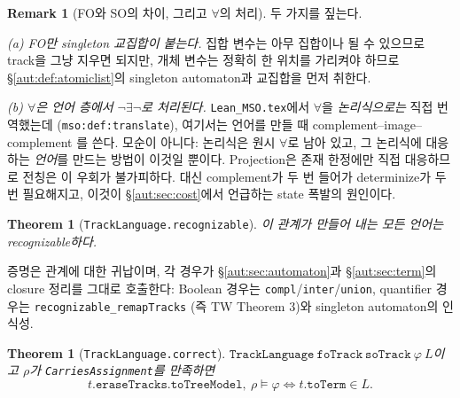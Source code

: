 \documentclass[11pt]{article}
\theoremstyle{definition}
\newtheorem{remark}[definition]{Remark}
\theoremstyle{plain}
\newtheorem{theorem}[definition]{Theorem}
\newcommand{\lean}[1]{\texttt{#1}}
\newcommand{\leanfile}[1]{\texttt{#1}}
\begin{document}
\begin{remark}[FO와 SO의 차이, 그리고 $\forall$의 처리]
\label{aut:rem:quantifiershapes}
두 가지를 짚는다.

\emph{(a) FO만 singleton 교집합이 붙는다.} 집합 변수는 아무 집합이나 될 수
있으므로 track을 그냥 지우면 되지만, 개체 변수는 정확히 한 위치를 가리켜야
하므로 \S\ref{aut:def:atomiclist}의 singleton automaton과 교집합을 먼저
취한다.

\emph{(b) $\forall$은 언어 층에서 $\lnot \exists \lnot$로 처리된다.}
\leanfile{Lean\_MSO.tex}에서 $\forall$을 \emph{논리식으로는} 직접 번역했는데
(\lean{mso:def:translate}), 여기서는 언어를 만들 때 complement--image--complement
를 쓴다. 모순이 아니다: 논리식은 원시 $\forall$로 남아 있고, 그 논리식에
대응하는 \emph{언어}를 만드는 방법이 이것일 뿐이다. Projection은 존재 한정에만
직접 대응하므로 전칭은 이 우회가 불가피하다. 대신 complement가 두 번 들어가
determinize가 두 번 필요해지고, 이것이 \S\ref{aut:sec:cost}에서 언급하는
state 폭발의 원인이다.
\end{remark}

\begin{theorem}[\lean{TrackLanguage.recognizable}]
\label{aut:thm:compilerecognizable}
이 관계가 만들어 내는 모든 언어는 recognizable하다.
\end{theorem}

증명은 관계에 대한 귀납이며, 각 경우가 \S\ref{aut:sec:automaton}과
\S\ref{aut:sec:term}의 closure 정리를 그대로 호출한다: Boolean 경우는
\lean{compl}/\lean{inter}/\lean{union}, quantifier 경우는
\lean{recognizable\_remapTracks} (즉 TW Theorem 3)와 singleton automaton의
인식성.

\begin{theorem}[\lean{TrackLanguage.correct}]
\label{aut:thm:compilecorrect}
$\lean{TrackLanguage}\ \lean{foTrack}\ \lean{soTrack}\ \varphi\ L$이고
$\rho$가 \lean{CarriesAssignment}를 만족하면
\[
  t.\lean{eraseTracks}.\lean{toTreeModel},\ \rho \models \varphi
  \iff
  t.\lean{toTerm} \in L.
\]
\end{theorem}
\end{document}
